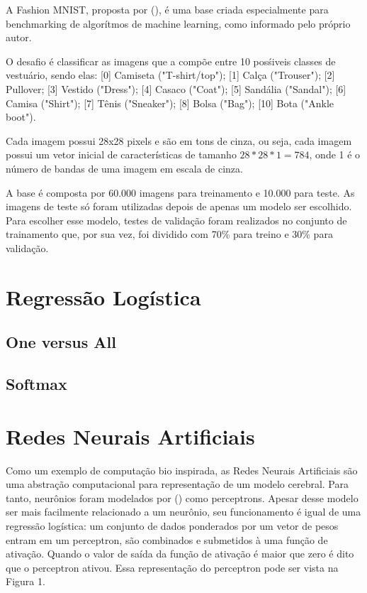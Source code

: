 \documentclass[conference]{IEEEtran}
\begin{document}
	A Fashion MNIST, proposta por \citeauthor{xiao2017/online} (\citeyear{xiao2017/online}), é uma base criada especialmente para benchmarking de algorítmos de machine learning, como informado pelo próprio autor.
	
	O desafio é classificar as imagens que a compõe entre 10 posśiveis classes de vestuário, sendo elas: [0] Camiseta ("T-shirt/top"); [1] Calça ("Trouser"); [2] Pullover; [3] Vestido ("Dress"); [4] Casaco ("Coat"); [5] Sandália ("Sandal"); [6] Camisa ("Shirt"); [7] Tênis ("Sneaker"); [8] Bolsa ("Bag"); [10] Bota ("Ankle boot").
	
	Cada imagem possui 28x28 pixels e são em tons de cinza, ou seja, cada imagem possui um vetor inicial de características de tamanho $28*28*1 = 784$, onde 1 é o número de bandas de uma imagem em escala de cinza.
	
	A base é composta por 60.000 imagens para treinamento e 10.000 para teste. As imagens de teste só foram utilizadas depois de apenas um modelo ser escolhido. Para escolher esse modelo, testes de validação foram realizados no conjunto de trainamento que, por sua vez, foi dividido com 70\% para treino e 30\% para validação.
	
\section{Regressão Logística}

\subsection{One versus All}

\subsection{Softmax}

\section{Redes Neurais Artificiais}

	Como um exemplo de computação bio inspirada, as Redes Neurais Artificiais são uma abstração computacional para representação de um modelo cerebral. Para tanto, neurônios foram modelados por	\citeauthor{rosenblatt1957perceptron} (\citeyear{rosenblatt1957perceptron}) como perceptrons. Apesar desse modelo ser mais facilmente relacionado a um neurônio, seu funcionamento é igual de uma regressão logística: um conjunto de dados ponderados por um vetor de pesos entram em um perceptron, são combinados e submetidos à uma função de ativação. Quando o valor de saída da função de ativação é maior que zero é dito que o perceptron ativou. Essa representação do perceptron pode ser vista na Figura 1.
	
\end{document}

